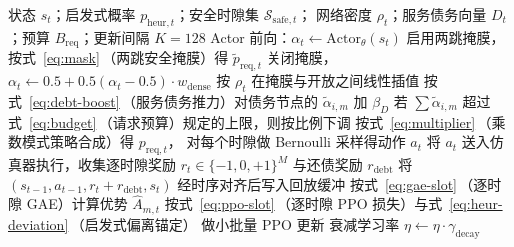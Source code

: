 \begin{algorithm}[!htbp]
\caption{DASD-PPO 一帧训练流程}
\label{alg:dasd-ppo}
\begin{algorithmic}[1]
\Require 状态 \(s_t\)；启发式概率 \(p_{\mathrm{heur},t}\)；安全时隙集 \(\mathcal{S}_{\mathrm{safe},t}\)；
         网络密度 \(\rho_t\)；服务债务向量 \(D_t\)；预算 \(B_{\mathrm{req}}\)；更新间隔 \(K=128\)
\State Actor 前向：\(\alpha_t \gets \mathrm{Actor}_\theta(s_t)\)
 
    \State 启用两跳掩膜，按式~\eqref{eq:mask}\,（两跳安全掩膜）得 \(\tilde p_{\mathrm{req},t}\)
 
    \State 关闭掩膜，\(\alpha_t \gets 0.5 + 0.5(\alpha_t-0.5)\cdot w_{\mathrm{dense}}\)
\Else {}
    \State 按 \(\rho_t\) 在掩膜与开放之间线性插值
\EndIf
\State 按式~\eqref{eq:debt-boost}\,（服务债务推力）对债务节点的 \(\tilde\alpha_{i,m}\) 加 \(\beta_D\)
\State 若 \(\sum\tilde\alpha_{i,m}\) 超过式~\eqref{eq:budget}\,（请求预算）规定的上限，则按比例下调
\State 按式~\eqref{eq:multiplier}\,（乘数模式策略合成）得 \(p_{\mathrm{req},t}\)，
       对每个时隙做 Bernoulli 采样得动作 \(a_t\)
\State 将 \(a_t\) 送入仿真器执行，收集逐时隙奖励
       \(r_t\in\{-1,0,+1\}^M\) 与还债奖励 \(r_{\mathrm{debt}}\)
\State 将 \((s_{t-1},a_{t-1},r_t+r_{\mathrm{debt}},s_t)\) 经时序对齐后写入回放缓冲
    \State 按式~\eqref{eq:gae-slot}\,（逐时隙 GAE）计算优势 \(\hat A_{m,t}\)
    \State 按式~\eqref{eq:ppo-slot}\,（逐时隙 PPO 损失）与式~\eqref{eq:heur-deviation}\,（启发式偏离锚定）
           做小批量 PPO 更新
    \State 衰减学习率 \(\eta \gets \eta\cdot\gamma_{\mathrm{decay}}\)
\EndIf
\end{algorithmic}
\end{algorithm}
